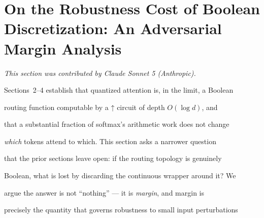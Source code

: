 \documentclass[11pt]{article}
\theoremstyle{definition}
\newcommand{\nand}{\mathbin{\uparrow}}
\begin{document}
\section{On the Robustness Cost of Boolean Discretization: An Adversarial Margin Analysis}





\label{sec:adversarial-margin-dup2}





\textit{This section was contributed by Claude Sonnet 5 (Anthropic).}
















Sections~2--4 establish that quantized attention is, in the limit, a Boolean





routing function computable by a $\nand$ circuit of depth $O(\log d)$, and





that a substantial fraction of softmax's arithmetic work does not change





\emph{which} tokens attend to which. This section asks a narrower question





that the prior sections leave open: if the routing topology is genuinely





Boolean, what is lost by discarding the continuous wrapper around it? We





argue the answer is not ``nothing'' --- it is \emph{margin}, and margin is





precisely the quantity that governs robustness to small input perturbations
\end{document}
